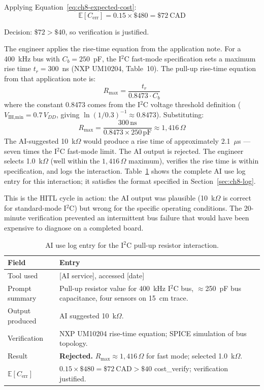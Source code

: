Applying Equation~\ref{eq:ch8-expected-cost}:
\[
  \mathbb{E}[C_{\text{err}}] = 0.15 \times \$480 = \$72~\text{CAD}
\]

Decision: $\$72 > \$40$, so verification is justified.

The engineer applies the rise-time equation from the application note.
For a 400~kHz bus with $C_b = 250$~pF, the I$^2$C fast-mode specification
sets a maximum rise time $t_r = 300$~ns (NXP UM10204, Table~10).
The pull-up rise-time equation from that application note is:
\[
  R_{\max} = \frac{t_r}{0.8473 \cdot C_b}
\]
where the constant 0.8473 comes from the I$^2$C voltage threshold definition
($V_{\text{IH,min}} = 0.7\,V_{DD}$, giving $\ln(1/0.3)^{-1} \approx 0.8473$).
Substituting:
\[
  R_{\max} = \frac{300\,\text{ns}}{0.8473 \times 250\,\text{pF}}
           \approx 1{,}416\,\Omega
\]
The AI-suggested 10~k$\Omega$ would produce a rise time of approximately
2.1~$\mu$s --- seven times the I$^2$C fast-mode limit.
The AI output is rejected.
The engineer selects 1.0~k$\Omega$ (well within the $1{,}416\,\Omega$ maximum),
verifies the rise time is within specification, and logs the interaction.
Table~\ref{tab:ch8-worked-log} shows the complete AI use log entry for this
interaction; it satisfies the format specified in Section~\ref{sec:ch8-log}.

This is the HITL cycle in action: the AI output was plausible (10~k$\Omega$
is correct for standard-mode I$^2$C) but wrong for the specific operating
conditions.
The 20-minute verification prevented an intermittent bus failure that would
have been expensive to diagnose on a completed board.

\begin{table}[htbp]
  \centering
  \caption{AI use log entry for the I$^2$C pull-up resistor interaction.}
  \label{tab:ch8-worked-log}
  \small
  \begin{tabular}{@{}lp{}@{}}
    \toprule
    \textbf{Field} & \textbf{Entry} \\
    \midrule
    Tool used        & [AI service], accessed [date] \\
    Prompt summary   & Pull-up resistor value for 400~kHz I$^2$C bus,
                       $\approx$250~pF bus capacitance, four sensors on 15~cm trace. \\
    Output produced  & AI suggested 10~k$\Omega$. \\
    Verification     & NXP UM10204 rise-time equation; SPICE simulation of bus topology. \\
    Result           & \textbf{Rejected.} $R_{\max} \approx 1{,}416\,\Omega$ for fast
                       mode; selected 1.0~k$\Omega$. \\
    $\mathbb{E}[C_{\text{err}}]$ & $0.15 \times \$480 = \$72~\text{CAD} > \$40$
                       cost\_verify; verification justified. \\
    \bottomrule
  \end{tabular}
\end{table}

